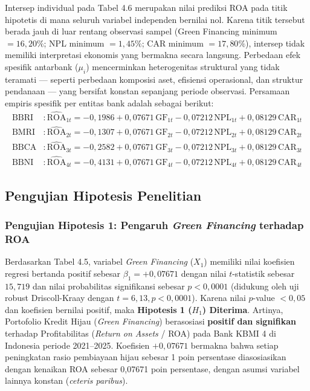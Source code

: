 \documentclass[12pt,a4paper]{article}
\numberwithin{equation}{section}
\begin{document}
\noindent
Intersep individual pada Tabel 4.6 merupakan nilai prediksi ROA pada titik hipotetis di mana seluruh variabel independen bernilai nol. Karena titik tersebut berada jauh di luar rentang observasi sampel (Green Financing minimum $= 16{,}20\%$; NPL minimum $= 1{,}45\%$; CAR minimum $= 17{,}80\%$), intersep tidak memiliki interpretasi ekonomis yang bermakna secara langsung. Perbedaan efek spesifik antarbank ($\mu_i$) mencerminkan heterogenitas struktural yang tidak teramati --- seperti perbedaan komposisi aset, efisiensi operasional, dan struktur pendanaan --- yang bersifat konstan sepanjang periode observasi. Persamaan empiris spesifik per entitas bank adalah sebagai berikut:
\begin{align}
  \text{BBRI} &: \widehat{\text{ROA}}_{1t} = -0{,}1986 + 0{,}07671\,\text{GF}_{1t} - 0{,}07212\,\text{NPL}_{1t} + 0{,}08129\,\text{CAR}_{1t} \\
  \text{BMRI} &: \widehat{\text{ROA}}_{2t} = -0{,}1307 + 0{,}07671\,\text{GF}_{2t} - 0{,}07212\,\text{NPL}_{2t} + 0{,}08129\,\text{CAR}_{2t} \\
  \text{BBCA} &: \widehat{\text{ROA}}_{3t} = -0{,}2582 + 0{,}07671\,\text{GF}_{3t} - 0{,}07212\,\text{NPL}_{3t} + 0{,}08129\,\text{CAR}_{3t} \\
  \text{BBNI} &: \widehat{\text{ROA}}_{4t} = -0{,}4131 + 0{,}07671\,\text{GF}_{4t} - 0{,}07212\,\text{NPL}_{4t} + 0{,}08129\,\text{CAR}_{4t}
\end{align}

\subsection{Pengujian Hipotesis Penelitian}

\subsubsection{Pengujian Hipotesis 1: Pengaruh \emph{Green Financing} terhadap ROA}
\noindent
Berdasarkan Tabel 4.5, variabel \emph{Green Financing} ($X_1$) memiliki nilai koefisien regresi bertanda positif sebesar $\beta_1 = +0{,}07671$ dengan nilai $t$-statistik sebesar $15{,}719$ dan nilai probabilitas signifikansi sebesar $p < 0{,}0001$ (didukung oleh uji robust Driscoll-Kraay dengan $t = 6{,}13, p < 0{,}0001$). Karena nilai $p$-value $< 0{,}05$ dan koefisien bernilai positif, maka \textbf{Hipotesis 1 ($H_1$) Diterima}. Artinya, Portofolio Kredit Hijau (\emph{Green Financing}) berasosiasi \textbf{positif dan signifikan} terhadap Profitabilitas (\emph{Return on Assets} / ROA) pada Bank KBMI 4 di Indonesia periode 2021--2025. Koefisien $+0{,}07671$ bermakna bahwa setiap peningkatan rasio pembiayaan hijau sebesar 1 poin persentase diasosiasikan dengan kenaikan ROA sebesar 0,07671 poin persentase, dengan asumsi variabel lainnya konstan (\emph{ceteris paribus}).
\end{document}
